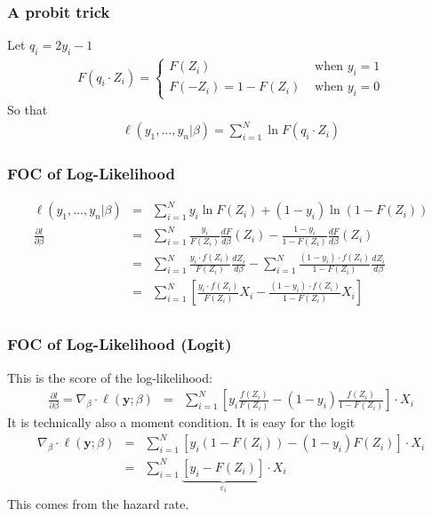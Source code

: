 \documentclass[aspectratio=169]{beamer}
\begin{document}
\begin{frame}
\frametitle{A probit trick}
Let $q_i = 2 y_i -1$
\begin{eqnarray*}
F(q_i \cdot Z_i) = 
\begin{cases}
F(Z_i)  &\mbox{ when } y_i=1 \\
F(-Z_i) = 1-F(Z_i)& \mbox{ when } y_i=0
\end{cases}
\end{eqnarray*}
So that 
\begin{eqnarray*}
\ell(y_1,\ldots, y_n | \beta) = \sum_{i=1}^N \ln F(q_i \cdot Z_i) 
\end{eqnarray*}
\end{frame}


\begin{frame}
\frametitle{FOC of Log-Likelihood}
\begin{eqnarray*}
\ell(y_1,\ldots,y_n | \beta) &=& \sum_{i=1}^N y_i \ln F(Z_i) + (1-y_i) \ln(1- F(Z_i)) \\
\frac{\partial l }{\partial \beta} &=& \sum_{i=1}^N \frac{y_i}{ F(Z_i)} \frac{ d F}{d \beta}(Z_i) - \frac{1-y_i}{1-F(Z_i)}  \frac{ d F}{d \beta} (Z_i)\\
 &=& \sum_{i=1}^N \frac{y_i \cdot f(Z_i) }{ F(Z_i)} \frac{ d Z_i}{d \beta} -  \sum_{i=1}^N \frac{(1-y_i)\cdot f(Z_i) }{1-F(Z_i)} \frac{ d Z_i}{d \beta} \\
 &=& \sum_{i=1}^N  \left[ \frac{y_i \cdot f(Z_i) }{ F(Z_i)} X_i -  \frac{(1-y_i)\cdot f(Z_i) }{1-F(Z_i)} X_i \right] \\
\end{eqnarray*}
\end{frame}

\begin{frame}
\frametitle{FOC of Log-Likelihood (Logit)}
This is the \alert{score} of the log-likelihood:
\begin{eqnarray*}
\frac{\partial l }{\partial \beta} = \nabla_{\beta} \cdot \ell(\mathbf{y}; \beta) &=&  \sum_{i=1}^N  \left[ y_i \frac{ f(Z_i) }{ F(Z_i)}  -  (1-y_i) \frac{f(Z_i) }{1-F(Z_i)} \right]  \cdot X_i 
\end{eqnarray*}
It is technically also a \alert{moment condition}. It is easy for the logit
\begin{eqnarray*}
 \nabla_{\beta} \cdot \ell(\mathbf{y}; \beta) &=&  \sum_{i=1}^N  \left[ y_i (1-F(Z_i)) -  (1-y_i) F(Z_i) \right] \cdot X_i \\
 &=&  \sum_{i=1}^N  \underbrace{\left[ y_i - F(Z_i) \right]}_{\varepsilon_i} \cdot X_i 
\end{eqnarray*}
This comes from the hazard rate.
\end{frame}
\end{document}
